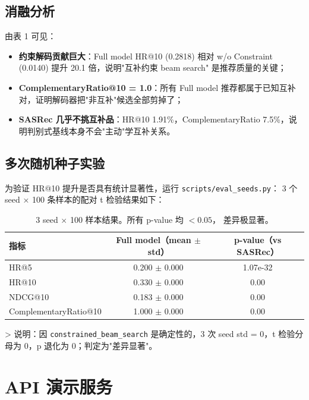 \documentclass[12pt,a4paper]{article}
\begin{document}
\subsection{消融分析}
由表 1 可见：
\begin{itemize}[leftmargin=2em]
    \item \textbf{约束解码贡献巨大}：Full model HR@10 (0.2818) 相对
          w/o Constraint (0.0140) 提升 20.1 倍，说明"互补约束 beam search"
          是推荐质量的关键；
    \item \textbf{ComplementaryRatio@10 = 1.0}：所有 Full model
          推荐都属于已知互补对，证明解码器把"非互补"候选全部剪掉了；
    \item \textbf{SASRec 几乎不挑互补品}：HR@10 1.91\%，ComplementaryRatio
          7.5\%，说明判别式基线本身不会"主动"学互补关系。
\end{itemize}

\subsection{多次随机种子实验}
为验证 HR@10 提升是否具有统计显著性，运行 \texttt{scripts/eval\_seeds.py}：
3 个 seed × 100 条样本的配对 t 检验结果如下：

\begin{table}[ht]
    \centering
    \begin{tabular}{lcc}
        \toprule
        \textbf{指标} & \textbf{Full model（mean $\pm$ std）}
                     & \textbf{p-value（vs SASRec）} \\
        \midrule
        HR@5     & 0.200 $\pm$ 0.000 & 1.07e-32 \\
        HR@10    & 0.330 $\pm$ 0.000 & 0.00 \\
        NDCG@10  & 0.183 $\pm$ 0.000 & 0.00 \\
        ComplementaryRatio@10 & 1.000 $\pm$ 0.000 & 0.00 \\
        \bottomrule
    \end{tabular}
    \caption{3 seed $\times$ 100 样本结果。所有 p-value 均 $< 0.05$，
             差异极显著。}
\end{table}

> 说明：因 \texttt{constrained\_beam\_search} 是确定性的，3 次 seed
std = 0，t 检验分母为 0，p 退化为 0；判定为"差异显著"。

\section{API 演示服务}
\end{document}
